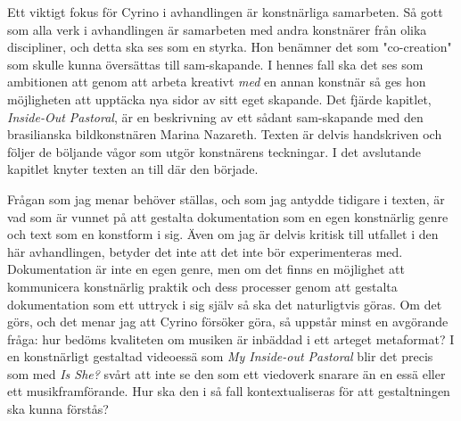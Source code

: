 \documentclass[11pt]{article}
\begin{document}
Ett viktigt fokus för Cyrino i avhandlingen är konstnärliga samarbeten. Så gott som alla verk i avhandlingen är samarbeten med andra konstnärer från olika discipliner, och detta ska ses som en styrka. Hon benämner det som "co-creation" som skulle kunna översättas till sam-skapande. I hennes fall ska det ses som ambitionen att genom att arbeta kreativt \emph{med} en annan konstnär så ges hon möjligheten att upptäcka nya sidor av sitt eget skapande. Det fjärde kapitlet, \emph{Inside-Out Pastoral}, är en beskrivning av ett sådant sam-skapande med den brasilianska bildkonstnären Marina Nazareth. Texten är delvis handskriven och följer de böljande vågor som utgör konstnärens teckningar. I det avslutande kapitlet knyter texten an till där den började.

Frågan som jag menar behöver ställas, och som jag antydde tidigare i texten, är vad som är vunnet på att gestalta dokumentation som en egen konstnärlig genre och text som en konstform i sig. Även om jag är delvis kritisk till utfallet i den här avhandlingen, betyder det inte att det inte bör experimenteras med. Dokumentation är inte en egen genre, men om det finns en möjlighet att kommunicera konstnärlig praktik och dess processer genom att gestalta dokumentation som ett uttryck i sig själv så ska det naturligtvis göras. Om det görs, och det menar jag att Cyrino försöker göra, så uppstår minst en avgörande fråga: hur bedöms kvaliteten om musiken är inbäddad i ett arteget metaformat? I en konstnärligt gestaltad videoessä som \emph{My Inside-out Pastoral} blir det precis som med \emph{Is She?} svårt att inte se den som ett viedoverk snarare än en essä eller ett musikframförande. Hur ska den i så fall kontextualiseras för att gestaltningen ska kunna förstås?
\end{document}
